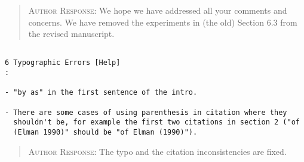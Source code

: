 \begin{quote}
\textsc{Author Response:}  We hope we have addressed all your comments and concerns. We have removed the experiments in (the old) Section 6.3 from the revised manuscript.
\end{quote}
\begin{verbatim}

6 Typographic Errors [Help]
:

- "by as" in the first sentence of the intro.

- There are some cases of using parenthesis in citation where they
  shouldn't be, for example the first two citations in section 2 ("of
  (Elman 1990)" should be "of Elman (1990)").

\end{verbatim}  
\begin{quote}
\textsc{Author Response:} The typo and the citation inconsistencies are fixed.
\end{quote}
